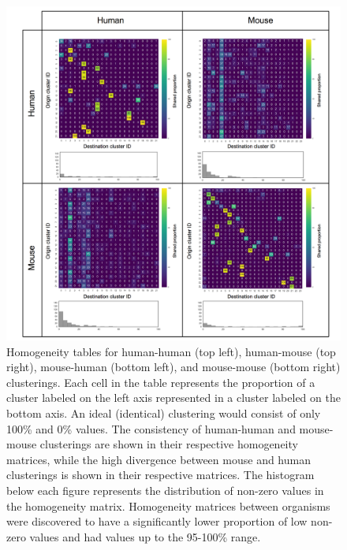 \documentclass[12pt,oneside,onecolumn,a4paper]{article}
\begin{document}
\begin{figure}[H]
\begin{center}
\includegraphics[width=\columnwidth]{figures/homogeneity_min}
\caption{Homogeneity tables for human-human (top left), human-mouse (top right), mouse-human (bottom left), and mouse-mouse (bottom right) clusterings. Each cell in the table represents the proportion of a cluster labeled on the left axis represented in a cluster labeled on the bottom axis. An ideal (identical) clustering would consist of only 100\% and 0\% values. The consistency of human-human and mouse-mouse clusterings are shown in their respective homogeneity matrices, while the high divergence between mouse and human clusterings is shown in their respective matrices. The histogram below each figure represents the distribution of non-zero values in the homogeneity matrix. Homogeneity matrices between organisms were discovered to have a significantly lower proportion of low non-zero values and had values up to the 95-100\% range.\label{fig:homogeneity_table}%
}
\end{center}
\end{figure}
\end{document}
